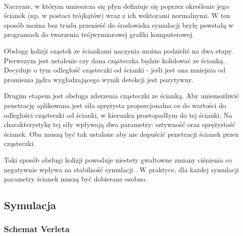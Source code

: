 \paragraph{}
\par
Naczynie, w którym umieszcza się płyn definiuje się poprzez określenie jego ścianek (np. w postaci trójkątów) wraz z ich wektorami normalnymi. W ten sposób można bez trudu przenieść do środowiska symulacji bryłę powstałą w programach do tworzenia trójwymiarowej grafiki komputerowej.
\par
Obsługę kolizji cząstek ze ściankami naczynia można podzielić na dwa etapy. Pierwszym jest ustalenie czy dana cząsteczka będzie kolidować ze ścianką. Decyduje o tym odległość cząsteczki od ścianki - jeśli jest ona mniejsza od promienia jądra wygładzającego wynik detekcji jest pozytywny.
\par
Drugim etapem jest obsługa zderzenia cząsteczki ze ścianką. Aby uniemożliwić penetrację aplikowana jest siła sprężysta proporcjonalna co do wartości do odległości cząsteczki od ścianki, w kierunku prostopadłym do tej ścianki. Na charakterystykę tej siły wpływają dwa parametry: sztywność oraz sprężystość ścianek. Oba muszą być tak ustalone aby nie dopuścić penetracji ścianek przez cząsteczki.
\par
Taki sposób obsługi kolizji powoduje niestety gwałtowne zmiany ciśnienia co negatywnie wpływa na stabilność symulacji \cite{teschner10}. W praktyce, dla każdej symulacji parametry ścianek muszą być dobierane osobno.
\par

\subsection{Symulacja}
\label{subsec:integration_ss}


\subsubsection{Schemat Verleta}
